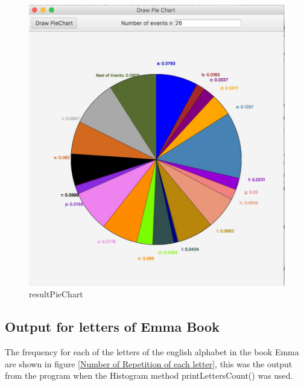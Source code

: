 \documentclass[a4paper,12pt]{article}
\begin{document}
\begin{figure}[H]
   \centering
   \includegraphics[width = 18cm]{resultPieChart} %
   \caption{resultPieChart}
   \label{resultPieChart}
\end{figure}

\subsection{Output for letters of Emma Book}

The frequency for each of the letters of the english alphabet in the book Emma are shown in figure  \ref{Number of Repetition of each letter}, this was the output from the program when the Histogram method printLettersCount() was used. 
\end{document}
